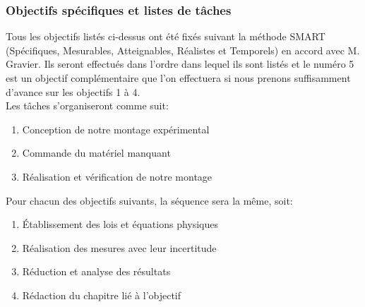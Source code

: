 \subsubsection{\large Objectifs spécifiques et listes de tâches}
Tous les objectifs listés ci-dessus ont été fixés suivant la 
méthode SMART (Spécifiques, Mesurables, Atteignables, Réalistes 
et Temporels) en accord avec M. Gravier. Ils seront effectués 
dans l'ordre dans lequel ils sont listés et le numéro 5 est un 
objectif complémentaire que l'on effectuera si nous prenons 
suffisamment d'avance sur les objectifs 1 à 4. \\
Les tâches s'organiseront comme suit:\\
\begin{enumerate}
	\item Conception de notre montage expérimental
	\item Commande du matériel manquant
	\item Réalisation et vérification de notre montage\\
\end{enumerate}
Pour chacun des objectifs suivants, la séquence sera la même, soit:\\
\begin{enumerate}
	\item Établissement des lois et équations physiques
	\item Réalisation des mesures avec leur incertitude
	\item Réduction et analyse des résultats
	\item Rédaction du chapitre lié à l'objectif
\end{enumerate}